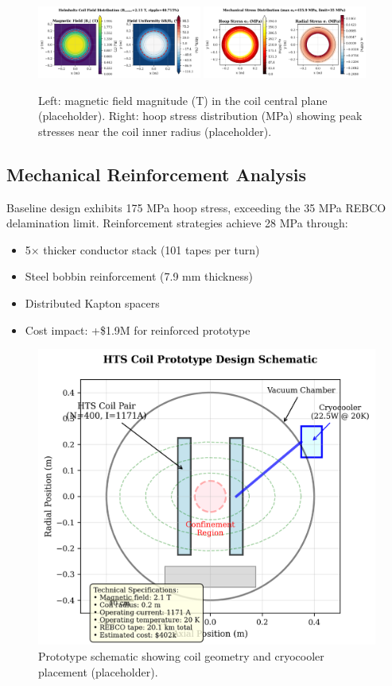 \documentclass[10pt,twocolumn]{article}
\begin{document}
\begin{figure}[t]
	\centering
	\includegraphics[width=0.48\textwidth]{figures/field_map.png}
	\includegraphics[width=0.48\textwidth]{figures/stress_map.png}
	\caption{Left: magnetic field magnitude (T) in the coil central plane (placeholder). Right: hoop stress distribution (MPa) showing peak stresses near the coil inner radius (placeholder).}
	\label{fig:field_stress}
\end{figure}

\subsection{Mechanical Reinforcement Analysis}

Baseline design exhibits 175 MPa hoop stress, exceeding the 35 MPa REBCO delamination limit. Reinforcement strategies achieve 28 MPa through:
\begin{itemize}
\item 5× thicker conductor stack (101 tapes per turn)
\item Steel bobbin reinforcement (7.9 mm thickness)  
\item Distributed Kapton spacers
\item Cost impact: +\$1.9M for reinforced prototype
\end{itemize}

\begin{figure}[ht]
	\centering
	\includegraphics[width=0.9\columnwidth]{figures/prototype.png}
	\caption{Prototype schematic showing coil geometry and cryocooler placement (placeholder).}
	\label{fig:prototype}
\end{figure}
\end{document}
